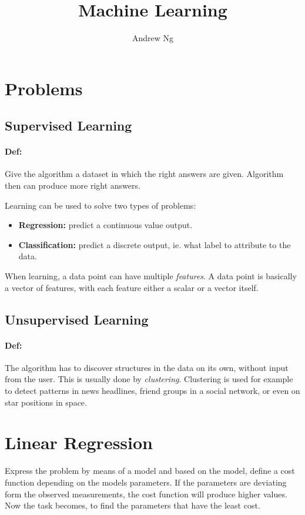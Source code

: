 \documentclass[11pt,a4paper]{article}
\title{Machine Learning}
\author{Andrew Ng}
\date{}
\begin{document}
\maketitle

\section{Problems}
\subsection{Supervised Learning}
\paragraph*{Def:} Give the algorithm a dataset in which the right answers are given. 
Algorithm then can produce more right answers. 

Learning can be used to solve two types of problems:
\begin{itemize}
\item \textbf{Regression:} predict a continuous value output.
\item \textbf{Classification:} predict a discrete output, ie. what label to attribute to the data.
\end{itemize}

When learning, a data point can have multiple \emph{features}. 
A data point is basically a vector of features, with each feature either a scalar or a vector itself.

\subsection{Unsupervised Learning}
\paragraph*{Def:} The algorithm has to discover structures in the data on its own, without input from the user.
This is usually done by \emph{clustering}. 
Clustering is used for example to detect patterns in news headlines, friend groups in a social network, or even on star positions in space.

\section{Linear Regression}
Express the problem by means of a model and based on the model, define a cost function depending on the models parameters. 
If the parameters are deviating form the observed measurements, the cost function will produce higher values. 
Now the task becomes, to find the parameters that have the least cost.
\end{document}
